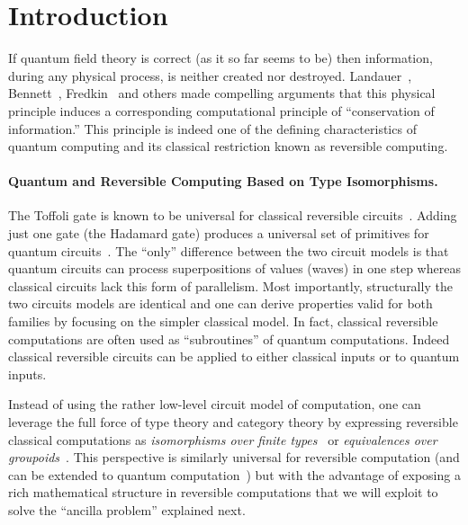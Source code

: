 \documentclass[sigplan,10pt,review,anonymous]{acmart}
\begin{document}
\section{Introduction}

If quantum field theory is correct (as it so far seems to be) then
information, during any physical process, is neither created nor
destroyed. Landauer~\cite{Landauer:1961,Landauer,bennett1985fundamental},
Bennett~\cite{bennett2010notes,bennett2003notes,Bennett:1973:LRC},
Fredkin~\cite{fredkin1982conservative} and others made compelling
arguments that this physical principle induces a corresponding
computational principle of ``conservation of information.'' This
principle is indeed one of the defining characteristics of quantum
computing and its classical restriction known as reversible computing.

\paragraph*{Quantum and Reversible Computing Based on Type
  Isomorphisms.} The Toffoli gate is known to be universal for
classical reversible circuits~\cite{Toffoli:1980}. Adding just one
gate (the Hadamard gate) produces a universal set of primitives for
quantum circuits~\cite{hadtoffuniv}. The ``only'' difference between
the two circuit models is that quantum circuits can process
superpositions of values (waves) in one step whereas classical
circuits lack this form of parallelism. Most importantly, structurally
the two circuits models are identical and one can derive properties
valid for both families by focusing on the simpler classical model. In
fact, classical reversible computations are often used as
``subroutines'' of quantum computations. Indeed classical reversible
circuits can be applied to either classical inputs or to quantum
inputs. 

Instead of using the rather low-level circuit model of computation,
one can leverage the full force of type theory and category theory by
expressing reversible classical computations as \emph{isomorphisms
  over finite types}~\cite{Fiore:2004,James:2012:IE:2103656.2103667}
or \emph{equivalences over
  groupoids}~\cite{DBLP:conf/esop/CaretteS16}. This perspective is
similarly universal for reversible computation (and can be extended to
quantum computation~\cite{10.1007/978-3-319-89366-2_19}) but with the
advantage of exposing a rich mathematical structure in reversible
computations that we will exploit to solve the ``ancilla problem''
explained next.
\end{document}
